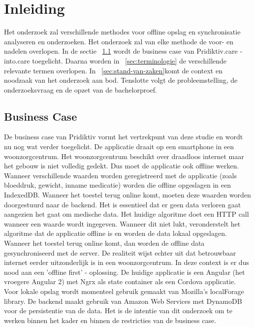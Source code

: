 \chapter{Inleiding}
\label{ch:inleiding}
Het onderzoek zal verschillende methodes voor offline opslag en synchronisatie analyseren en onderzoeken. Het onderzoek zal van elke methode de voor- en nadelen overlopen. In de sectie ~\ref{sec:business-case} wordt de business case van Pridiktiv.care - into.care toegelicht. Daarna worden in ~\ref{sec:terminologie} de verschillende relevante termen overlopen. In ~\ref{sec:stand-van-zaken}komt de context en noodzaak van het onderzoek aan bod. Tenslotte volgt de probleemstelling, de onderzoeksvraag en de opzet van de bachelorproef.
\section{Business Case}
\label{sec:business-case}
De business case van Pridiktiv vormt het vertrekpunt van deze studie en wordt nu nog wat verder toegelicht. De applicatie draait op een smartphone in een woonzorgcentrum. Het woonzorgcentrum beschikt over draadloos internet maar het gebouw is niet volledig gedekt. Dus moet de applicatie ook offline werken. Wanneer verschillende waarden worden geregistreerd met de applicatie (zoals bloeddruk, gewicht, inname medicatie) worden die offline opgeslagen in een IndexedDB. Wanneer het toestel terug online komt, moeten deze waarden worden doorgestuurd naar de backend. Het is essentieel dat er geen data verloren gaat aangezien het gaat om medische data. Het huidige algoritme doet een HTTP call wanneer een waarde wordt ingegeven. Wanneer dit niet lukt, veronderstelt het algoritme dat de applicatie offline is en worden de data lokaal opgeslagen. Wanneer het toestel terug online komt, dan worden de offline data gesynchroniseerd met de server. De realiteit wijst echter uit dat betrouwbaar internet eerder uitzonderlijk is in een woonzorgcentrum. In deze context is er dus nood aan een 'offline first' -  oplossing. De huidige applicatie is een Angular (het vroegere Angular 2) met Ngrx als state container als een Cordova applicatie. Voor lokale opslag wordt momenteel gebruik gemaakt van Mozilla's localForage library. De backend maakt gebruik van Amazon Web Services met DynamoDB voor de persistentie van de data. Het is de intentie van dit onderzoek om te werken binnen het kader en binnen de restricties van de business case.
